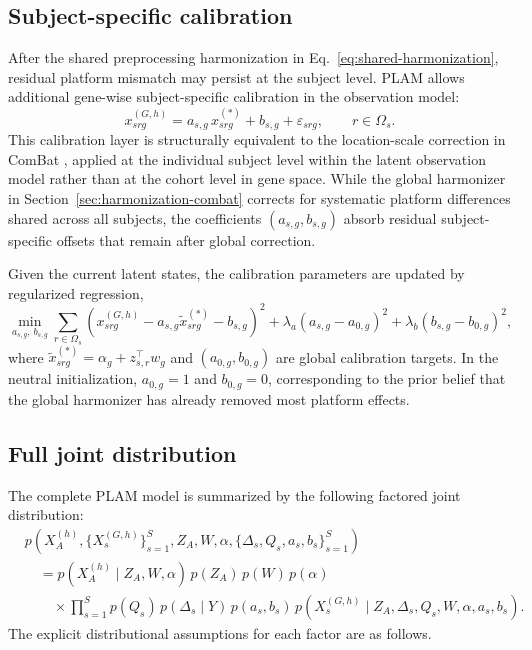 \documentclass[11pt]{article}
\numberwithin{equation}{section}
\begin{document}
\subsection{Subject-specific calibration}
\label{sec:calibration}

After the shared preprocessing harmonization in Eq.~\eqref{eq:shared-harmonization},
residual platform mismatch may persist at the subject level.  PLAM
allows additional gene-wise subject-specific calibration in the observation model:
\begin{equation}
  \label{eq:prob-observation-model}
  x_{srg}^{(G,h)} = a_{s,g}\,x_{srg}^{(*)} + b_{s,g} + \varepsilon_{srg},
  \qquad r\in\Omega_s.
\end{equation}
This calibration layer is structurally equivalent to the location-scale correction in
ComBat \cite{johnson2007combat}, applied at the individual subject level within the
latent observation model rather than at the cohort level in gene space.  While the
global harmonizer in Section~\ref{sec:harmonization-combat} corrects for systematic
platform differences shared across all subjects, the coefficients $(a_{s,g}, b_{s,g})$
absorb residual subject-specific offsets that remain after global correction.

Given the current latent states, the calibration parameters are updated by regularized
regression,
\begin{equation}
  \label{eq:prob-calibration-update}
  \min_{a_{s,g},\,b_{s,g}}
  \sum_{r\in\Omega_s}
  \left(
  x_{srg}^{(G,h)} - a_{s,g}\tilde{x}_{srg}^{(*)} - b_{s,g}
  \right)^2
  +
  \lambda_a (a_{s,g}-a_{0,g})^2
  +
  \lambda_b (b_{s,g}-b_{0,g})^2,
\end{equation}
where $\tilde{x}_{srg}^{(*)}=\alpha_g + z_{s,r}^\top w_g$ and $(a_{0,g},b_{0,g})$
are global calibration targets.  In the neutral initialization, $a_{0,g}=1$ and
$b_{0,g}=0$, corresponding to the prior belief that the global harmonizer has already
removed most platform effects.

\subsection{Full joint distribution}
\label{sec:joint}

The complete PLAM model is summarized by the following factored joint
distribution:
\begin{equation}
  \label{eq:prob-joint}
  \begin{aligned}
  &p\!\left(
  X_A^{(h)}, \{X_s^{(G,h)}\}_{s=1}^S,
  Z_A, W, \alpha,
  \{\Delta_s,Q_s,a_s,b_s\}_{s=1}^S
  \right) \\
  &\quad =
  p(X_A^{(h)}\mid Z_A,W,\alpha)\,
  p(Z_A)\,
  p(W)\,
  p(\alpha) \\
  &\qquad\times
  \prod_{s=1}^S
  p(Q_s)\,
  p(\Delta_s\mid Y)\,
  p(a_s,b_s)\,
  p(X_s^{(G,h)}\mid Z_A,\Delta_s,Q_s,W,\alpha,a_s,b_s).
  \end{aligned}
\end{equation}
The explicit distributional assumptions for each factor are as follows.
\end{document}
